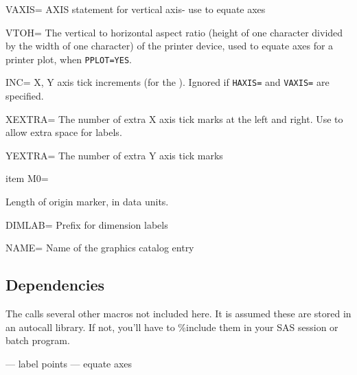 \begin{proglist}
\item[VAXIS=]
AXIS statement for vertical axis- use to equate axes

\item[VTOH=]
The vertical to horizontal aspect ratio (height of one
character divided by the width of one character) of the
printer device, used to equate axes for a printer plot,
when \texttt{PPLOT=YES}. 

\item[INC=]
X, Y axis tick increments (for the ).  Ignored
if \texttt{HAXIS=} and \texttt{VAXIS=} are specified. 

\item[XEXTRA=]
The number of extra X axis tick marks at the left and right.  Use to
allow extra space for labels. 

\item[YEXTRA=]
The number of extra Y axis tick marks 

item M0=

Length of origin marker, in data units. 

\item[DIMLAB=]
Prefix for dimension labels 

\item[NAME=]
Name of the graphics catalog entry         

\end{proglist}

\subsection*{Dependencies}%

The  calls several other macros not included here.
It is assumed these are stored in an autocall library.  If not,
you'll have to \%include them in your SAS session or batch program.

 --- label points 
 --- equate axes

